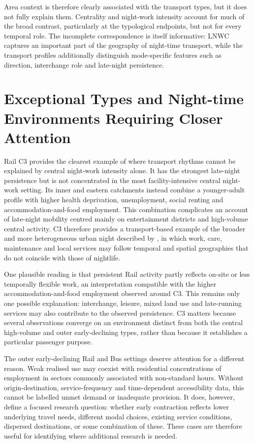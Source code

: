 Area context is therefore clearly associated with the transport types, but it does not fully explain them. Centrality and night-work intensity account for much of the broad contrast, particularly at the typological endpoints, but not for every temporal role. The incomplete correspondence is itself informative: LNWC captures an important part of the geography of night-time transport, while the transport profiles additionally distinguish mode-specific features such as direction, interchange role and late-night persistence.

\section{Exceptional Types and Night-time Environments Requiring Closer Attention}

Rail C3 provides the clearest example of where transport rhythms cannot be explained by central night-work intensity alone. It has the strongest late-night persistence but is not concentrated in the most facility-intensive central night-work setting. Its inner and eastern catchments instead combine a younger-adult profile with higher health deprivation, unemployment, social renting and accommodation-and-food employment. This combination complicates an account of late-night mobility centred mainly on entertainment districts and high-volume central activity. C3 therefore provides a transport-based example of the broader and more heterogeneous urban night described by \citet{Shaw2014,Shaw2022}, in which work, care, maintenance and local services may follow temporal and spatial geographies that do not coincide with those of nightlife.

One plausible reading is that persistent Rail activity partly reflects on-site or less temporally flexible work, an interpretation compatible with the higher accommodation-and-food employment observed around C3. This remains only one possible explanation: interchange, leisure, mixed land use and late-running services may also contribute to the observed persistence. C3 matters because several observations converge on an environment distinct from both the central high-volume and outer early-declining types, rather than because it establishes a particular passenger purpose.

The outer early-declining Rail and Bus settings deserve attention for a different reason. Weak realised use may coexist with residential concentrations of employment in sectors commonly associated with non-standard hours. Without origin-destination, service-frequency and time-dependent accessibility data, this cannot be labelled unmet demand or inadequate provision. It does, however, define a focused research question: whether early contraction reflects lower underlying travel needs, different modal choices, existing service conditions, dispersed destinations, or some combination of these. These cases are therefore useful for identifying where additional research is needed.

